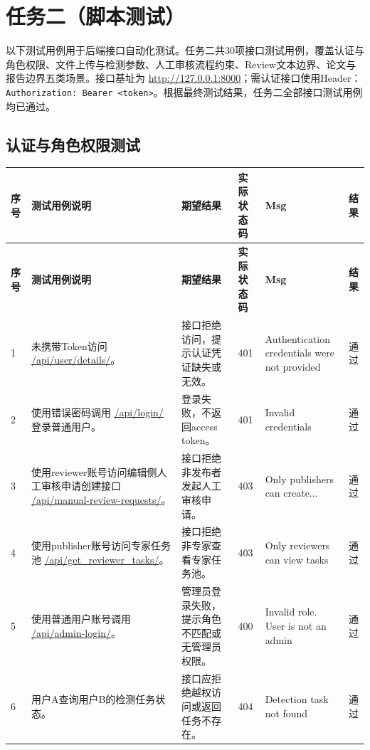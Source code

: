 \documentclass[UTF8,a4paper,12pt]{ctexart}
\newcommand{\pass}{通过}
\begin{document}
\section{任务二（脚本测试）}

以下测试用例用于后端接口自动化测试。任务二共30项接口测试用例，覆盖认证与角色权限、文件上传与检测参数、人工审核流程约束、Review文本边界、论文与报告边界五类场景。接口基址为 \url{http://127.0.0.1:8000}；需认证接口使用Header：\texttt{Authorization: Bearer \textless token\textgreater}。根据最终测试结果，任务二全部接口测试用例均已通过。

\subsection{认证与角色权限测试}

\begin{longtable}{|P{0.8cm}|P{4.2cm}|P{4.0cm}|P{1.4cm}|P{4.3cm}|P{1.0cm}|}
\hline
\textbf{序号} & \textbf{测试用例说明} & \textbf{期望结果} & \textbf{实际状态码} & \textbf{Msg} & \textbf{结果} \\
\hline
\endfirsthead

\hline
\textbf{序号} & \textbf{测试用例说明} & \textbf{期望结果} & \textbf{实际状态码} & \textbf{Msg} & \textbf{结果} \\
\hline
\endhead

1 & 未携带Token访问 \url{/api/user/details/}。 & 接口拒绝访问，提示认证凭证缺失或无效。 & 401 & Authentication credentials were not provided & \pass \\
\hline

2 & 使用错误密码调用 \url{/api/login/} 登录普通用户。 & 登录失败，不返回access token。 & 401 & Invalid credentials & \pass \\
\hline

3 & 使用reviewer账号访问编辑侧人工审核申请创建接口 \url{/api/manual-review-requests/}。 & 接口拒绝非发布者发起人工审核申请。 & 403 & Only publishers can create... & \pass \\
\hline

4 & 使用publisher账号访问专家任务池 \url{/api/get_reviewer_tasks/}。 & 接口拒绝非专家查看专家任务池。 & 403 & Only reviewers can view tasks & \pass \\
\hline

5 & 使用普通用户账号调用 \url{/api/admin-login/}。 & 管理员登录失败，提示角色不匹配或无管理员权限。 & 400 & Invalid role. User is not an admin & \pass \\
\hline

6 & 用户A查询用户B的检测任务状态。 & 接口应拒绝越权访问或返回任务不存在。 & 404 & Detection task not found & \pass \\
\hline

\end{longtable}
\end{document}
